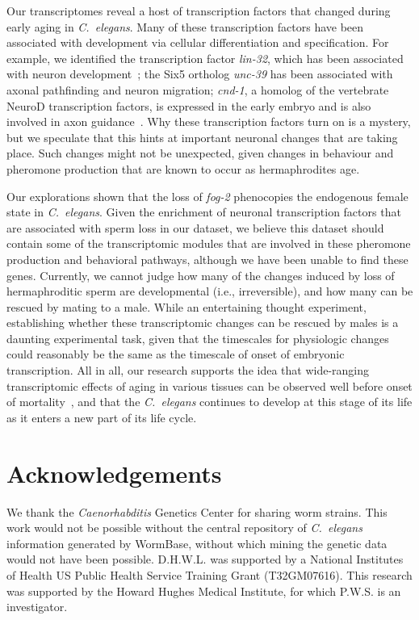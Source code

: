 \documentclass[9pt,twocolumn,twoside]{gsag3jnl}
\newcommand{\cel}{\emph{C.~elegans}}
\newcommand{\fog}{\emph{fog-2}}
\begin{document}
Our transcriptomes reveal a host of transcription factors that changed during early aging in \cel{}. Many of these transcription factors have been associated with development via cellular differentiation and specification. For example, we identified the transcription factor \emph{lin-32}, which has been associated with neuron development~\citep{Chalfie1989,Zhao1995,Portman2000}; the Six5 ortholog \emph{unc-39} has been associated with axonal pathfinding and neuron migration\citep{Yanowitz2004}; \emph{cnd-1}, a homolog  of the vertebrate NeuroD transcription factors, is expressed in the early embryo and is also involved in axon guidance~\citep{Schmitz2007}. Why these transcription factors turn on is a mystery, but we speculate that this hints at important neuronal changes that are taking place. Such changes might not be unexpected, given changes in behaviour and pheromone production that are known to occur as hermaphrodites age.

Our explorations shown that the loss of \fog{} phenocopies the endogenous female state in \cel{}.
Given the enrichment of neuronal transcription factors that are associated with sperm loss in our dataset, we believe this dataset should contain some of the transcriptomic modules that are involved in these pheromone production and behavioral pathways, although we have been unable to find these genes. Currently, we cannot judge how many of the changes induced by loss of hermaphroditic sperm are developmental (i.e., irreversible), and how many can be rescued by mating to a male.
While an entertaining thought experiment, establishing whether these transcriptomic changes can be rescued by males is a daunting experimental task, given that the timescales for physiologic changes could reasonably be the same as the timescale of onset of embryonic transcription. All in all, our research supports the idea that wide-ranging transcriptomic effects of aging in various tissues can be observed well before onset of mortality~\citep{Stroustrup2013}, and that the \cel{} continues to develop at this stage of its life as it enters a new part of its life cycle.

\section*{Acknowledgements}

We thank the \emph{Caenorhabditis} Genetics Center for sharing worm strains. This work would not be possible without the central repository of \cel{} information generated by WormBase, without which mining the genetic data would not have been possible. D.H.W.L. was supported by a National Institutes of Health US Public Health Service Training Grant (T32GM07616). This research was supported by the Howard Hughes Medical Institute, for which P.W.S. is an investigator.
\end{document}
